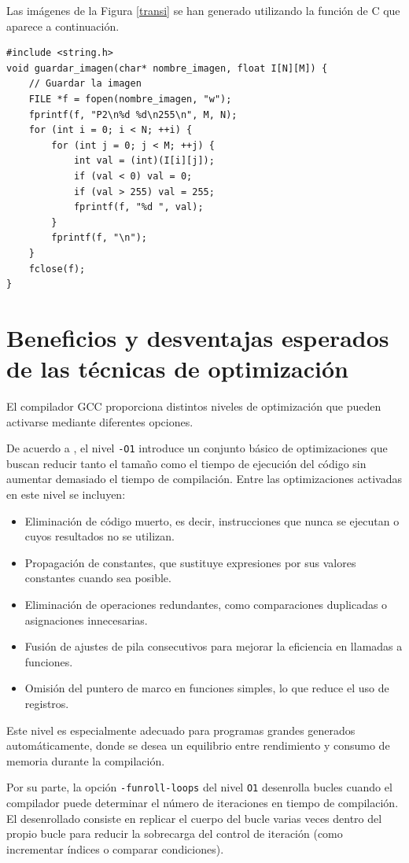 \documentclass[11pt,a4paper,twoside]{article}
\theoremstyle{definition}
\begin{document}
	Las imágenes de la Figura \ref{transi} se han generado utilizando la función de C que aparece a continuación.
	\begin{verbatim}
#include <string.h>
void guardar_imagen(char* nombre_imagen, float I[N][M]) {
	// Guardar la imagen
	FILE *f = fopen(nombre_imagen, "w");
	fprintf(f, "P2\n%d %d\n255\n", M, N);
	for (int i = 0; i < N; ++i) {
		for (int j = 0; j < M; ++j) {
			int val = (int)(I[i][j]);
			if (val < 0) val = 0;
			if (val > 255) val = 255;
			fprintf(f, "%d ", val);
		}
		fprintf(f, "\n");
	}
	fclose(f);
}
	\end{verbatim}
	
	
	\section{Beneficios y desventajas esperados de las técnicas de optimización}

	El compilador GCC proporciona distintos niveles de optimización que pueden activarse mediante diferentes opciones.
	
	De acuerdo a \cite{gcc}, el nivel \texttt{-O1} introduce un conjunto básico de optimizaciones que buscan reducir tanto el tamaño como el tiempo de ejecución del código sin aumentar demasiado el tiempo de compilación. Entre las optimizaciones activadas en este nivel se incluyen:
	
	\begin{itemize}
		\item Eliminación de código muerto, es decir, instrucciones que nunca se ejecutan o cuyos resultados no se utilizan.
		\item Propagación de constantes, que sustituye expresiones por sus valores constantes cuando sea posible.
		\item Eliminación de operaciones redundantes, como comparaciones duplicadas o asignaciones innecesarias.
		\item Fusión de ajustes de pila consecutivos para mejorar la eficiencia en llamadas a funciones.
		\item Omisión del puntero de marco en funciones simples, lo que reduce el uso de registros.
	\end{itemize}
	
	Este nivel es especialmente adecuado para programas grandes generados automáticamente, donde se desea un equilibrio entre rendimiento y consumo de memoria durante la compilación.
	
	Por su parte, la opción \texttt{-funroll-loops} del nivel \texttt{O1} desenrolla bucles cuando el compilador puede determinar el número de iteraciones en tiempo de compilación. El desenrollado consiste en replicar el cuerpo del bucle varias veces dentro del propio bucle para reducir la sobrecarga del control de iteración (como incrementar índices o comparar condiciones).
	
\end{document}
